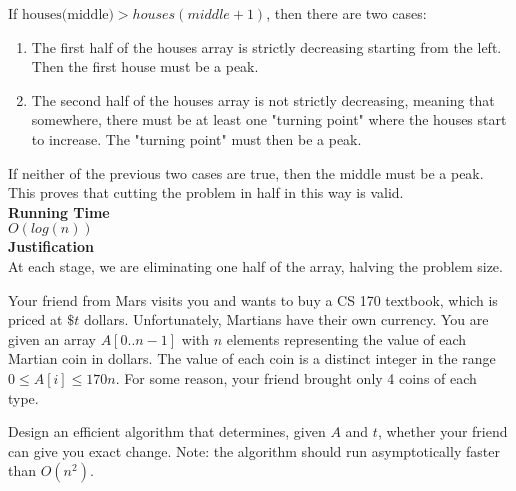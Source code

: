 \begin{qunlist}
{\begin{enumerate}
\end{enumerate}
If $\text{houses(middle)}>houses(middle+1)$, then there are two cases:
\begin{enumerate}
	\item The first half of the houses array is strictly decreasing starting from the left. Then the first house must be a peak. 
	\item The second half of the houses array is not strictly decreasing, meaning that somewhere, there must be at least one "turning point" where the houses start to increase. The "turning point" must then be a peak.
\end{enumerate}
If neither of the previous two cases are true, then the middle must be a peak. This proves that cutting the problem in half in this way is valid. \\
\textbf{Running Time}\\
$O(log(n))$\\
\textbf{Justification}\\
At each stage, we are eliminating one half of the array, halving the problem size.
}
 

\pagebreak


Your friend from Mars visits you and wants to buy a CS 170 textbook, which is priced at $\$t$ dollars. Unfortunately, Martians have their own currency. You are given an array $A[0..n-1]$ with $n$ elements representing the value of each Martian coin in dollars. The value of each coin is a distinct integer in the range $0 \le A[i] \le 170n$. For some reason, your friend brought only 4 coins of each type. 

Design an efficient algorithm that determines, given $A$ and $t$, whether your friend can give you exact change. Note: the algorithm should run asymptotically faster than $O(n^2)$.


\end{qunlist}
